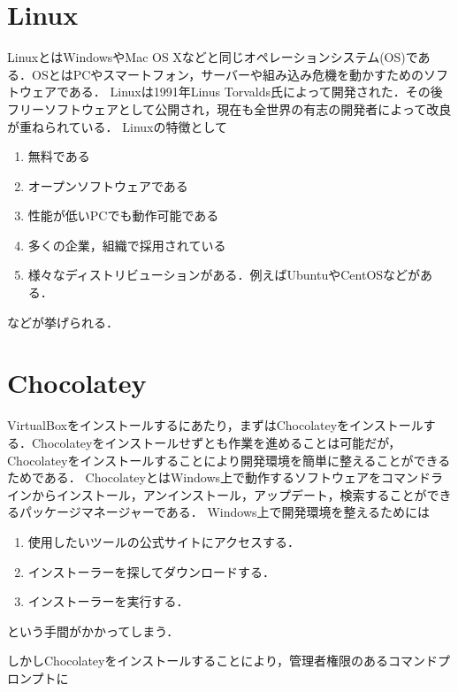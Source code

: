 \newpage

\section{Linux}
LinuxとはWindowsやMac OS Xなどと同じオペレーションシステム(OS)である．OSとはPCやスマートフォン，サーバーや組み込み危機を動かすためのソフトウェアである．
Linuxは1991年Linus Torvalds氏によって開発された．その後フリーソフトウェアとして公開され，現在も全世界の有志の開発者によって改良が重ねられている．
Linuxの特徴として
\begin{enumerate}
 \item 無料である
 \item オープンソフトウェアである
 \item 性能が低いPCでも動作可能である
 \item 多くの企業，組織で採用されている
 \item 様々なディストリビューションがある．例えばUbuntuやCentOSなどがある．
\end{enumerate}
などが挙げられる．

\newpage

\section{Chocolatey}
VirtualBoxをインストールするにあたり，まずはChocolateyをインストールする．Chocolateyをインストールせずとも作業を進めることは可能だが，Chocolateyをインストールすることにより開発環境を簡単に整えることができるためである．
ChocolateyとはWindows上で動作するソフトウェアをコマンドラインからインストール，アンインストール，アップデート，検索することができるパッケージマネージャーである．
Windows上で開発環境を整えるためには
\begin{enumerate}
 \item 使用したいツールの公式サイトにアクセスする．
 \item インストーラーを探してダウンロードする．
 \item インストーラーを実行する．
\end{enumerate}
という手間がかかってしまう．

\newpage
しかしChocolateyをインストールすることにより，管理者権限のあるコマンドプロンプトに


